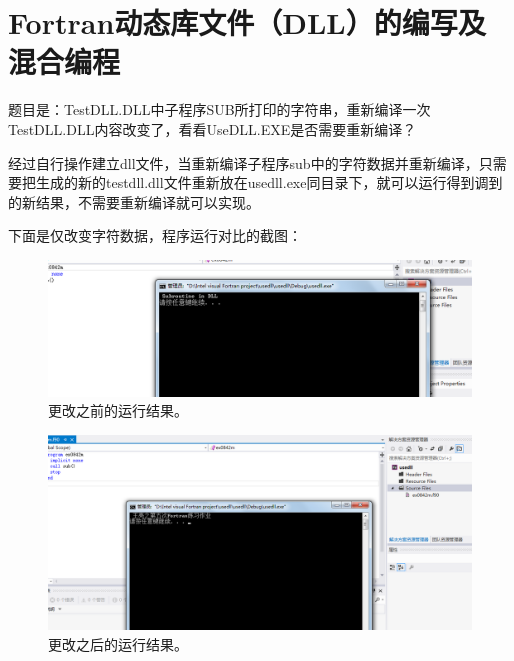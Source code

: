 \documentclass[hyperref,UTF-8]{ctexart}
\begin{document}
\section{Fortran动态库文件（DLL）的编写及混合编程}
题目是：TestDLL.DLL中子程序SUB所打印的字符串，重新编译一次TestDLL.DLL内容改变了，看看UseDLL.EXE是否需要重新编译？

经过自行操作建立dll文件，当重新编译子程序sub中的字符数据并重新编译，只需要把生成的新的testdll.dll文件重新放在usedll.exe同目录下，就可以运行得到调到的新结果，不需要重新编译就可以实现。

下面是仅改变字符数据，程序运行对比的截图：
\begin{figure}[ht]
\centering
\includegraphics[scale=0.5]{11.png}
\caption{更改之前的运行结果。}
\end{figure}
\begin{figure}[ht]
\centering
\includegraphics[scale=0.5]{王亮2.png}
\caption{更改之后的运行结果。}
\end{figure}
\end{document}
